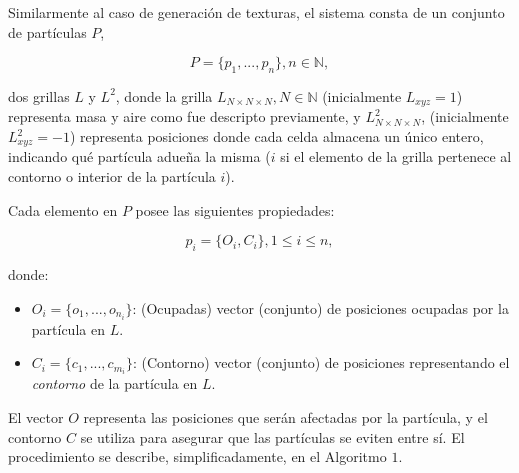 Similarmente al caso de generación de texturas, el sistema consta de un conjunto de part\'iculas $P$,

\begin{equation}
  P = \{p_{1}, ... , p_{n}\}, n  \in \mathbb{N},
\end{equation}

\noindent dos grillas $L$ y $L^{2}$, donde la grilla $L_{N\times N \times N}, N \in \mathbb{N}$ (inicialmente $L_{xyz}=1$) representa masa y aire como fue descripto previamente, y $L^{2}_{N\times N \times N}$, (inicialmente $L^{2}_{xyz}=-1$) representa posiciones donde cada celda almacena un único entero, indicando qu\'e part\'icula adue\~na la misma ($i$ si el elemento de la grilla pertenece al contorno o interior de la part\'icula $i$).

Cada elemento en $P$ posee las siguientes propiedades:

\begin{equation}
  p_{i} = \{O_{i}, C_{i}\}, 1 \le i \le n,
\end{equation}

\noindent donde:

\begin{itemize}
\item $O_{i} = \{o_{1}, ... , o_{n_{i}}\}$: (Ocupadas) vector (conjunto) de posiciones ocupadas por la part\'icula en $L$.

\item $C_{i} = \{c_{1}, ... , c_{m_{i}}\}$: (Contorno) vector (conjunto) de posiciones representando el {\em contorno} de la part\'icula en $L$.
\end{itemize}

El vector $O$ representa las posiciones que ser\'an afectadas por la part\'icula, y el contorno $C$ se utiliza para asegurar que las part\'iculas se eviten entre s\'i.
El procedimiento se describe, simplificadamente, en el Algoritmo $1$. 

